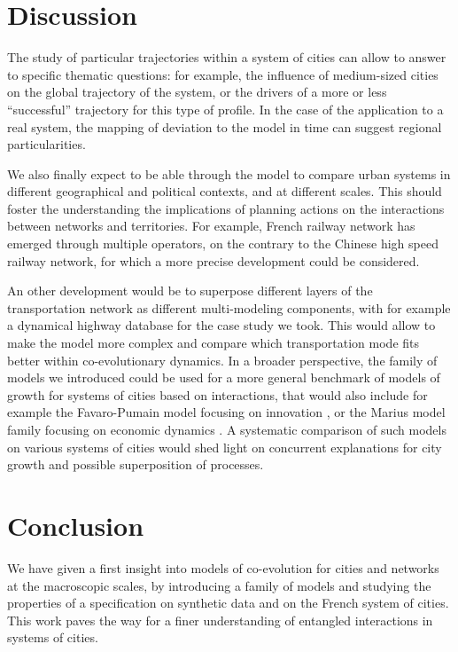 \section{Discussion}



The study of particular trajectories within a system of cities can allow to answer to specific thematic questions: for example, the influence of medium-sized cities on the global trajectory of the system, or the drivers of a more or less ``successful'' trajectory for this type of profile. In the case of the application to a real system, the mapping of deviation to the model in time can suggest regional particularities.


We also finally expect to be able through the model to compare urban systems in different geographical and political contexts, and at different scales. This should foster the understanding the implications of planning actions on the interactions between networks and territories. For example, French railway network has emerged through multiple operators, on the contrary to the Chinese high speed railway network, for which a more precise development could be considered.


An other development would be to superpose different layers of the transportation network as different multi-modeling components, with for example a dynamical highway database for the case study we took. This would allow to make the model more complex and compare which transportation mode fits better within co-evolutionary dynamics. In a broader perspective, the family of models we introduced could be used for a more general benchmark of models of growth for systems of cities based on interactions, that would also include for example the Favaro-Pumain model focusing on innovation \citep{favaro2011gibrat}, or the Marius model family focusing on economic dynamics \citep{cottineau2014evolution}. A systematic comparison of such models on various systems of cities would shed light on concurrent explanations for city growth and possible superposition of processes.


\section*{Conclusion}

We have given a first insight into models of co-evolution for cities and networks at the macroscopic scales, by introducing a family of models and studying the properties of a specification on synthetic data and on the French system of cities. This work paves the way for a finer understanding of entangled interactions in systems of cities.





